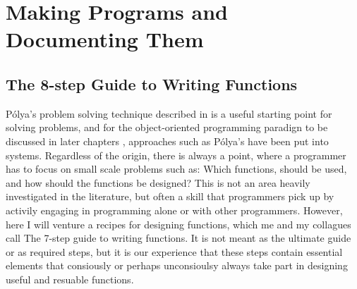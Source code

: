 \documentclass[fsharpNotes.tex]{subfiles}
\begin{document}
\chapter{Making Programs and Documenting Them}


\section{The 8-step Guide to Writing Functions}
\label{sec:8step}
Pólya's problem solving technique described in  is a useful starting point for solving problems, and for the object-oriented programming paradign to be discussed in later chapters , approaches such as Pólya's have been put into systems. Regardless of the origin, there is always a point, where a programmer has to focus on small scale problems such as: Which functions, should be used, and how should the functions be designed? This is not an area heavily investigated in the literature, but often a skill that programmers pick up by activily engaging in programming alone or with other programmers. However, here I will venture a recipes for designing functions, which me and my collagues call The 7-step guide to writing functions. It is not meant as the ultimate guide or as required steps, but it is our experience that these steps contain essential elements that consiously or perhaps unconsioulsy always take part in designing useful and resuable functions.
\end{document}
